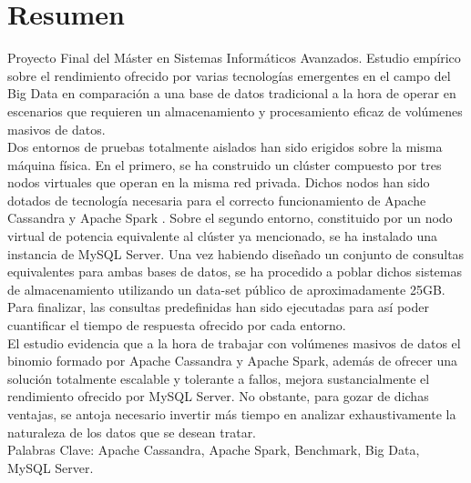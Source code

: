 \section*{Resumen}

Proyecto Final del Máster en Sistemas Informáticos Avanzados. Estudio empírico sobre el rendimiento ofrecido por varias tecnologías emergentes en el campo del Big Data en comparación a una base de datos tradicional a la hora de operar en escenarios que requieren un almacenamiento y procesamiento eficaz de volúmenes masivos de datos.\\

Dos entornos de pruebas totalmente aislados han sido erigidos sobre la misma máquina física. En el primero, se ha construido un clúster compuesto por tres nodos virtuales que operan en la misma red privada. Dichos nodos han sido dotados de tecnología necesaria para el correcto funcionamiento de Apache Cassandra \cite{lakshman2010cassandra} y Apache Spark \cite{zaharia2010spark}. Sobre el segundo entorno, constituido por un nodo virtual de potencia equivalente al clúster ya mencionado, se ha instalado una instancia de MySQL Server. Una vez habiendo diseñado un conjunto de consultas equivalentes para ambas bases de datos, se ha procedido a poblar dichos sistemas de almacenamiento utilizando un data-set público de aproximadamente 25GB. Para finalizar, las consultas predefinidas han sido ejecutadas para así poder cuantificar el tiempo de respuesta ofrecido por cada entorno.\\

El estudio evidencia que a la hora de trabajar con volúmenes masivos de datos el binomio formado por Apache Cassandra y Apache Spark, además de ofrecer una solución totalmente escalable y tolerante a fallos, mejora sustancialmente el rendimiento ofrecido por MySQL Server. No obstante, para gozar de dichas ventajas, se antoja necesario invertir más tiempo en analizar exhaustivamente la naturaleza de los datos que se desean tratar.\\


Palabras Clave: Apache Cassandra, Apache Spark, Benchmark, Big Data, MySQL Server.\\
